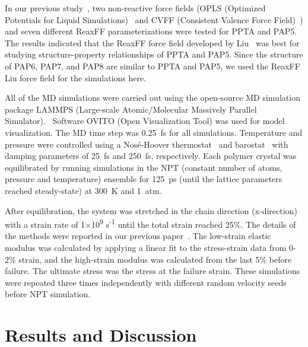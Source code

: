 \documentclass[journal=langd5,manuscript=article]{achemso}
\begin{document}
\FloatBarrier
In our previous study~\cite{yang2021molecular}, two non-reactive force fields (OPLS (Optimized Potentials for Liquid Simulations)~\cite{dodda2017ligpargen} and CVFF (Consistent Valence Force Field)~\cite{Dauber1988Structure}) and seven different ReaxFF parameterizations were tested for PPTA and PAP5.
The results indicated that the ReaxFF force field developed by Liu~\cite{liu2011reaxff} was best for studying structure-property relationships of PPTA and PAP5.
Since the structure of PAP6, PAP7, and PAP8 are similar to PPTA and PAP5, we used the ReaxFF Liu force field for the simulations here. 


All of the MD simulations were carried out using the open-source MD simulation package LAMMPS (Large-scale Atomic/Molecular Massively Parallel Simulator).~\cite{plimpton1995fast}
Software OVITO (Open Visualization Tool) \cite{stukowski2009visualization} was used for model visualization.
The MD time step was 0.25~fs for all simulations.
Temperature and pressure were controlled using a Nos\'e-Hoover thermostat~\cite{hoover1985canonical} and barostat~\cite{hoover1986constant} with damping parameters of 25~fs and 250~fs, respectively.
Each polymer crystal was equilibrated by running simulations in the NPT (constant number of atoms, pressure and temperature) ensemble for 125~ps (until the lattice parameters reached steady-state) at 300~K and 1~atm.

After equilibration, the system was stretched in the chain direction (x-direction) with a strain rate of 1$\times$10\textsuperscript{9} s\textsuperscript{-1} until the total strain reached 25\%. 
The details of the methods were reported in our previous paper~\cite{yang2021molecular}.
The low-strain elastic modulus was calculated by applying a linear fit to the stress-strain data from 0-2\% strain, and the high-strain modulus was calculated from the last 5\% before failure.
The ultimate stress was the stress at the failure strain.
These simulations were repeated three times independently with different random velocity seeds before NPT simulation.

\FloatBarrier
\section{Results and Discussion}
\end{document}
